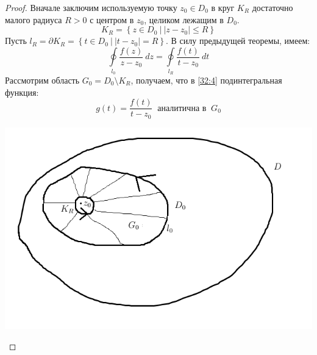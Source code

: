 \documentclass[../../main.tex]{subfiles}
\begin{document}
\begin{proof}
	Вначале заключим используемую точку $z_0 \in D_0$ в круг $K_R$ достаточно малого радиуса $R>0$ с центром в $z_0$, целиком лежащим в $D_0$.
	\[ K_R = \left\lbrace z \in D_0 \ \big| \ |z-z_0| \le R\right\rbrace  \]
	Пусть $l_R = \partial K_R = \left\lbrace t \in D_0 \ \big| \ |t-z_0| = R \right\rbrace $. В силу предыдущей теоремы, имеем:
	\begin{equation}
	\label{32:4}
	\oint \limits_{l_0} \frac{f(z)}{z-z_0} \ dz = \oint \limits_{l_R} \frac{f(t)}{t-z_0} \ dt
	\end{equation}
	Рассмотрим область $G_0 = D_0 \setminus K_R$, получаем, что в \eqref{32:4} подинтегральная функция:
	\[ g(t) = \frac{f(t)}{t-z_0} \ \text{ аналитична в } \ G_0 \]
	\begin{center}
		\includegraphics[width=0.7\linewidth]{lecture32_2}
	\end{center}
	

\end{proof}
\end{document}
